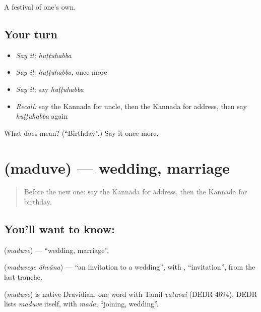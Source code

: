 \begin{grammarlens}[title={What you've built}]
A festival of one's own.
\end{grammarlens}

\subsection*{Your turn}
\begin{itemize}
\raggedright
  \item \emph{Say it:} \emph{huṭṭuhabba}
  \item \emph{Say it:} \emph{huṭṭuhabba}, once more
  \item \emph{Say it:} say \emph{huṭṭuhabba}
  \item \emph{Recall:} say the Kannada for uncle, then the Kannada for address, then say \emph{huṭṭuhabba} again
\end{itemize}

\begin{tcolorbox}[breakable,colback=teal!4,colframe=teal!35!black,title={Before you move on}]
What does  mean? (\textquotedblleft{}Birthday\textquotedblright{}.) Say it once more.
\end{tcolorbox}
\section[\texorpdfstring{\kn{ಮದುವೆ} (maduve)}{ಮದುವೆ (maduve)}]{ (maduve) — wedding, marriage}

\label{lesson:KA-C91-wedding}



\begin{quote}
Before the new one: say the Kannada for address, then the Kannada for birthday.
\end{quote}

\subsection*{You'll want to know: }
\textbf{} (\emph{maduve}) — \textquotedblleft{}wedding, marriage\textquotedblright{}.

\textbf{ } (\emph{maduvege āhvāna}) — \textquotedblleft{}an invitation to a wedding\textquotedblright{}, with \textbf{}, \textquotedblleft{}invitation\textquotedblright{}, from the last tranche.

\begin{cousinweb}
\textbf{} (\emph{maduve}) is native Dravidian, one word with Tamil \emph{vatuvai} (DEDR 4694). DEDR lists \emph{maduve} itself, with \emph{mada}, \textquotedblleft{}joining, wedding\textquotedblright{}.
\end{cousinweb}

